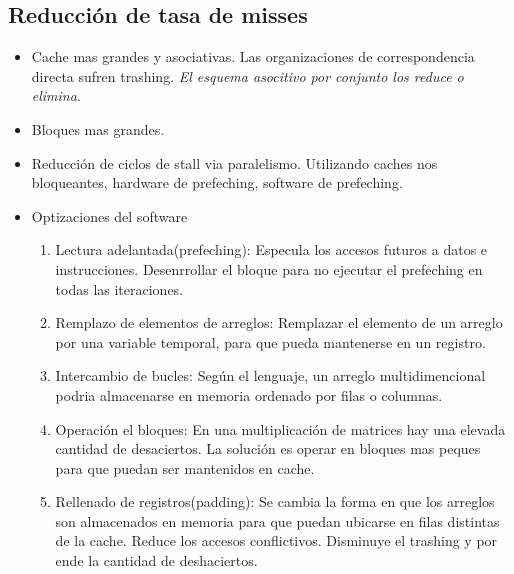 \documentclass{article}
\begin{document}
\subsection{Reducción de tasa de misses}

\begin{itemize}
    \item Cache mas grandes y asociativas. Las organizaciones de correspondencia directa sufren trashing. \textit{El esquema asocitivo por conjunto los reduce o elimina}.
    \item Bloques mas grandes.
    \item Reducción de ciclos de stall via paralelismo. Utilizando caches nos bloqueantes, hardware de prefeching, software de prefeching.
    \item Optizaciones del software
    \begin{enumerate}
        \item Lectura adelantada(prefeching): Especula los accesos futuros a datos e instrucciones. Desenrrollar el bloque para no ejecutar el prefeching en todas las iteraciones.
        \item Remplazo de elementos de arreglos: Remplazar el elemento de un arreglo por una variable temporal, para que pueda mantenerse en un registro.
        \item Intercambio de bucles: Según el lenguaje, un arreglo multidimencional podria almacenarse en memoria ordenado por filas o columnas.
        \item Operación el bloques: En una multiplicación de matrices hay una elevada cantidad de desaciertos. La solución es operar en bloques mas peques para que puedan ser mantenidos en cache.
        \item Rellenado de registros(padding): Se cambia la forma en que los arreglos son almacenados en memoria para que puedan ubicarse en filas distintas de la cache. Reduce los accesos conflictivos. Disminuye el trashing y por ende la cantidad de deshaciertos.
    \end{enumerate}
\end{itemize}
\end{document}
